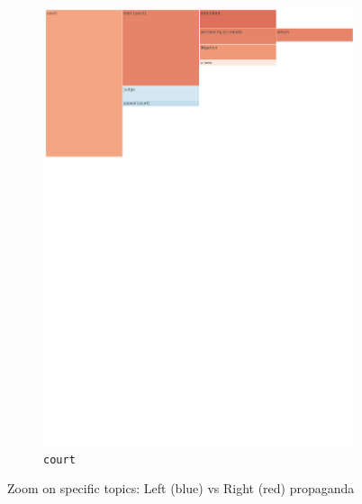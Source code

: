 \begin{figure}[!htbp]
{\begin{subfigure}{0.49\textwidth}
		\includegraphics[trim={0.15cm 19.5cm 5cm 0.15cm},clip,width=\linewidth]{figures/baly_iptc_weighted_prop_total_leaning_diff_zoom_court.pdf}
		\caption{\texttt{court}}
            \label{fig:baly_iptc_weighted_prop_total_leaning_diff_zoom_court}
	\end{subfigure}}
	
    \caption{Zoom on specific topics: Left (blue) vs Right (red) propaganda}
    \label{fig:baly_iptc_weighted_prop_total_leaning_diff_zoom}
\end{figure}

